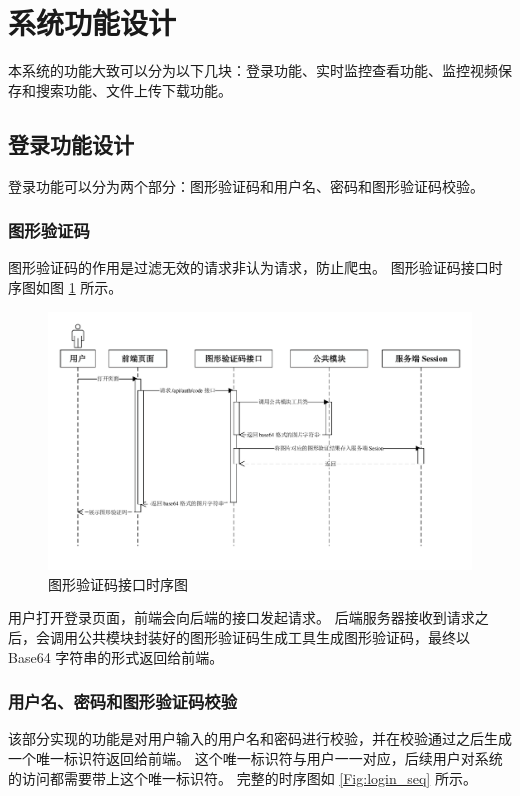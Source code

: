 \newpage
\section{系统功能设计}
本系统的功能大致可以分为以下几块：登录功能、实时监控查看功能、监控视频保存和搜索功能、文件上传下载功能。

\subsection{登录功能设计}
登录功能可以分为两个部分：图形验证码和用户名、密码和图形验证码校验。


\subsubsection{图形验证码}
图形验证码的作用是过滤无效的请求非认为请求，防止爬虫。
图形验证码接口时序图如图 \ref{Fig:code_seq} 所示。

\begin{figure}[ht]
    \centering
    \includegraphics[width=1\linewidth]{./Figure/IMG_code_seq.pdf}
    \caption{图形验证码接口时序图}\label{Fig:code_seq}
\end{figure}

用户打开登录页面，前端会向后端的接口发起请求。
后端服务器接收到请求之后，会调用公共模块封装好的图形验证码生成工具生成图形验证码，最终以 Base64 字符串的形式返回给前端。


\newpage
\subsubsection{用户名、密码和图形验证码校验}
该部分实现的功能是对用户输入的用户名和密码进行校验，并在校验通过之后生成一个唯一标识符返回给前端。
这个唯一标识符与用户一一对应，后续用户对系统的访问都需要带上这个唯一标识符。
完整的时序图如 \ref{Fig:login_seq} 所示。

